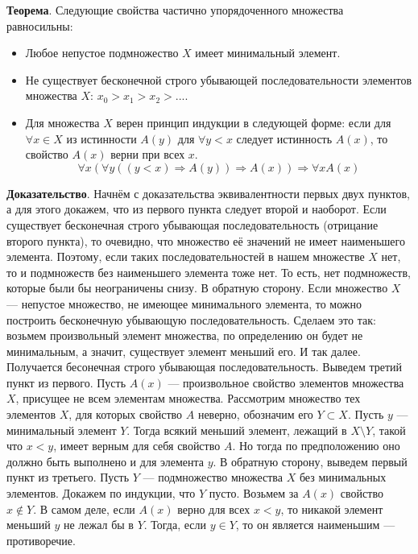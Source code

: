 \documentclass[a4paper]{book}
\begin{document}
\textbf{Теорема}. Следующие свойства частично упорядоченного множества равносильны:
\begin{itemize}
	\item Любое непустое подмножество $X$ имеет минимальный элемент.
	\item Не существует бесконечной строго убывающей последовательности элементов множества $X$: $x_0>x_1>x_2>...$. 
	\item Для множества $X$ верен принцип индукции в следующей форме: если для $\forall x\in X$ из истинности $A(y)$ для $\forall y<x$ следует истинность $A(x)$, то свойство $A(x)$ верни при всех $x$. 
	\begin{equation}
		\forall x(\forall y((y<x)\Rightarrow A(y)) \Rightarrow A(x))\Rightarrow\forall x A(x)
	\end{equation}
\end{itemize}

\textbf{Доказательство}. Начнём с доказательства эквивалентности первых двух пунктов, а для этого докажем, что из первого пункта следует второй и наоборот. 
Если существует бесконечная строго убывающая последовательность (отрицание второго пункта), то очевидно, что множество её значений не имеет наименьшего элемента. Поэтому, если таких последовательностей в нашем множестве $X$ нет, то и подмножеств без наименьшего элемента тоже нет. То есть, нет подмножеств, которые были бы неограничены снизу. 
В обратную сторону. Если множество $X$ --- непустое множество, не имеющее минимального элемента, то можно построить бесконечную убывающую последовательность. Сделаем это так: возьмем произвольный элемент множества, по определению он будет не минимальным, а значит, существует элемент меньший его. И так далее. Получается бесонечная строго убывающая последовательность. 
Выведем третий пункт из первого. Пусть $A(x)$ --- произвольное свойство элементов множества $X$, присущее не всем элементам множества. Рассмотрим множество тех элементов $X$, для которых свойство $A$ неверно, обозначим его $Y\subset X$. Пусть $y$ --- минимальный элемент $Y$. Тогда всякий меньший элемент, лежащий в $X\setminus Y$, такой что $x<y$, имеет верным для себя свойство $A$. Но тогда по предположению оно должно быть выполнено и для элемента $y$. 
В обратную сторону, выведем первый пункт из третьего. Пусть $Y$ --- подмножество множества $X$ без минимальных элементов. Докажем по индукции, что $Y$ пусто. Возьмем за $A(x)$ свойство $x\notin Y$. В самом деле, если $A(x)$ верно для всех $x<y$, то никакой элемент меньший $y$ не лежал бы в $Y$. Тогда, если $y\in Y$, то он является наименьшим --- противоречие. 
\end{document}
